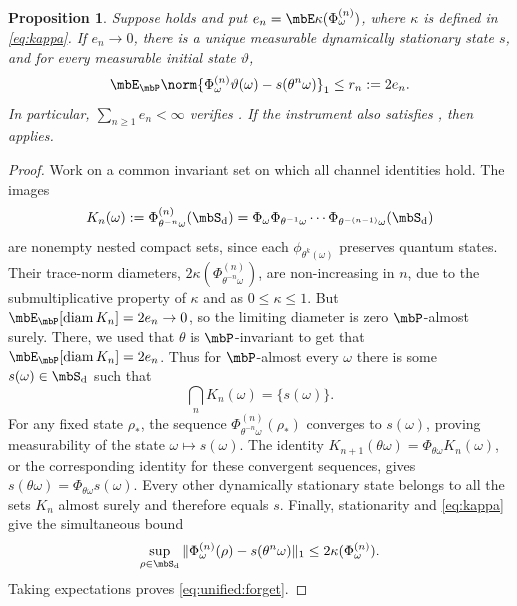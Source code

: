\documentclass[a4paper]{article}
\numberwithin{equation}{section}   %
\theoremstyle{plain}   %
\theoremstyle{plain}   %
\newtheorem{prop}[lemma]{Proposition}   %
\theoremstyle{examplestyle}
\DeclareMathOperator{\states}{\mbS_d}   %
\DeclareMathOperator{\pr}{\mbP}           %
\begin{document}
\begin{prop}
\label{prop:unified:common}
    Suppose  holds and put $e_n=\mbE\kappa(\Phi^{(n)}_\omega)$, where $\kappa$ is defined in \eqref{eq:kappa}.
    If $e_n\to0$, there is a unique measurable dynamically stationary state $s$, and for every measurable initial state $\vartheta$,
    \begin{equation}
    \label{eq:unified:forget}
     \mbE_{\pr}
        \norm{\Phi^{(n)}_\omega\vartheta(\omega)-s(\theta^n\omega)}_1
        \le r_n:=2e_n.
    \end{equation}
    In particular, $\sum_{n\ge1}e_n<\infty$ verifies . If the instrument also satisfies , then  applies.
\end{prop}
%
    \begin{proof}
        Work on a common invariant set on which all channel identities hold. 
        The images
        \[
         K_n(\omega):=\Phi^{(n)}_{\theta^{-n}\omega}(\states)
         =\Phi_\omega\Phi_{\theta^{-1}\omega}\cdots
           \Phi_{\theta^{-(n-1)}\omega}(\states)
        \]
        are nonempty nested compact sets, since each $\phi_{\theta^k(\omega)}$ preserves quantum states. 
        Their trace-norm diameters, $2\kappa(\Phi^{(n)}_{\theta^{-n}\omega})$, are non-increasing in $n$, due to the submultiplicative property of $\kappa$ and as $0\le \kappa\le 1$. 
        But $\mbE_{\pr}[\operatorname{diam}K_n]=2e_n\to0$, so the limiting diameter is zero $\mbP$-almost surely.
        There, we used that $\theta$ is $\mbP$-invariant to get that $\mbE_{\pr}[\operatorname{diam}K_n]=2e_n$. 
        Thus for $\mbP$-almost every $\omega$ there is some $s(\omega)\in\states$ such that 
        \[
            \bigcap_nK_n(\omega)=\{s(\omega)\}.
        \] 
        For any fixed state $\rho_*$, the sequence $\Phi^{(n)}_{\theta^{-n}\omega}(\rho_*)$ converges to $s(\omega)$, proving measurability of the state $\omega\mapsto s(\omega)$. 
        The identity $K_{n+1}(\theta\omega)=\Phi_{\theta\omega}K_n(\omega)$, or the corresponding identity for these convergent sequences, gives $s(\theta\omega)=\Phi_{\theta\omega}s(\omega)$. Every other dynamically stationary state belongs to all the sets $K_n$ almost surely and therefore equals $s$. Finally, stationarity and \eqref{eq:kappa} give the simultaneous bound
        \[
         \sup_{\rho\in\states}\|\Phi^{(n)}_\omega(\rho)-s(\theta^n\omega)\|_1
         \le2\kappa(\Phi^{(n)}_\omega).
        \]
        Taking expectations proves \eqref{eq:unified:forget}.
    \end{proof}
    
\end{document}
